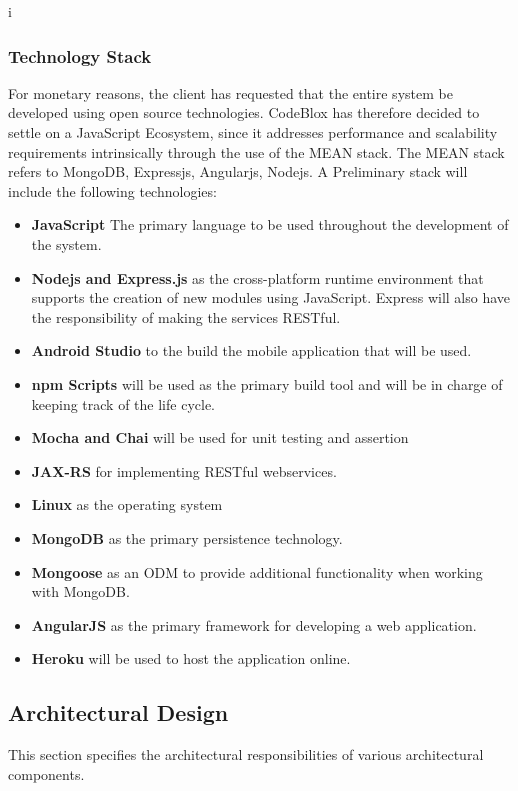 i\documentclass[a4paper,12pt]{article}
\begin{document}
	\subsubsection{Technology Stack}
	For monetary reasons, the client has requested that the entire system be developed using open source technologies. CodeBlox has therefore decided to settle on a JavaScript Ecosystem, since it addresses performance and scalability requirements intrinsically through the use of the MEAN stack. The MEAN stack refers to MongoDB, Expressjs, Angularjs, Nodejs. A Preliminary stack will include the following technologies:
	
	\begin{itemize}
		\item \textbf{JavaScript} The primary language to be used throughout the development of the system.
		\item \textbf{Nodejs and Express.js} as the cross-platform runtime environment that supports the creation of new modules using JavaScript. Express will also have the responsibility of making the services RESTful. 
		\item \textbf{Android Studio} to the build the mobile application that will be used.
		\item \textbf{npm Scripts} will be used as the primary build tool and will be in charge of keeping track of the life cycle.
		\item \textbf{Mocha and Chai} will be used for unit testing and assertion
		\item \textbf{JAX-RS} for implementing RESTful webservices.
		\item \textbf{Linux} as the operating system
		\item \textbf{MongoDB} as the primary persistence technology.
		\item \textbf{Mongoose} as an ODM to provide additional functionality when working with MongoDB.
		\item \textbf{AngularJS} as the primary framework for developing a web application.
		\item \textbf{Heroku} will be used to host the application online.
	\end{itemize}
	
	\newpage
	\subsection{Architectural Design}
	This section specifies the architectural responsibilities of various architectural components.
\end{document}
